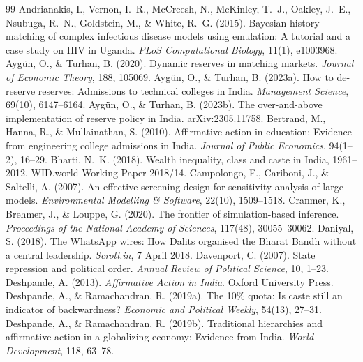 \documentclass[11pt,a4paper]{article}
\begin{document}
\begin{thebibliography}{99}
 Andrianakis, I., Vernon, I.~R., McCreesh, N., McKinley, T.~J., Oakley, J.~E., Nsubuga, R.~N., Goldstein, M., \& White, R.~G. (2015). Bayesian history matching of complex infectious disease models using emulation: A tutorial and a case study on HIV in Uganda. \emph{PLoS Computational Biology}, 11(1), e1003968.
 Ayg\"un, O., \& Turhan, B. (2020). Dynamic reserves in matching markets. \emph{Journal of Economic Theory}, 188, 105069.
 Ayg\"un, O., \& Turhan, B. (2023a). How to de-reserve reserves: Admissions to technical colleges in India. \emph{Management Science}, 69(10), 6147--6164.
 Ayg\"un, O., \& Turhan, B. (2023b). The over-and-above implementation of reserve policy in India. arXiv:2305.11758.
 Bertrand, M., Hanna, R., \& Mullainathan, S. (2010). Affirmative action in education: Evidence from engineering college admissions in India. \emph{Journal of Public Economics}, 94(1--2), 16--29.
 Bharti, N.~K. (2018). Wealth inequality, class and caste in India, 1961--2012. WID.world Working Paper 2018/14.
 Campolongo, F., Cariboni, J., \& Saltelli, A. (2007). An effective screening design for sensitivity analysis of large models. \emph{Environmental Modelling \& Software}, 22(10), 1509--1518.
 Cranmer, K., Brehmer, J., \& Louppe, G. (2020). The frontier of simulation-based inference. \emph{Proceedings of the National Academy of Sciences}, 117(48), 30055--30062.
 Daniyal, S. (2018). The WhatsApp wires: How Dalits organised the Bharat Bandh without a central leadership. \emph{Scroll.in}, 7 April 2018.
 Davenport, C. (2007). State repression and political order. \emph{Annual Review of Political Science}, 10, 1--23.
 Deshpande, A. (2013). \emph{Affirmative Action in India}. Oxford University Press.
 Deshpande, A., \& Ramachandran, R. (2019a). The 10\% quota: Is caste still an indicator of backwardness? \emph{Economic and Political Weekly}, 54(13), 27--31.
 Deshpande, A., \& Ramachandran, R. (2019b). Traditional hierarchies and affirmative action in a globalizing economy: Evidence from India. \emph{World Development}, 118, 63--78.

\end{thebibliography}
\end{document}
